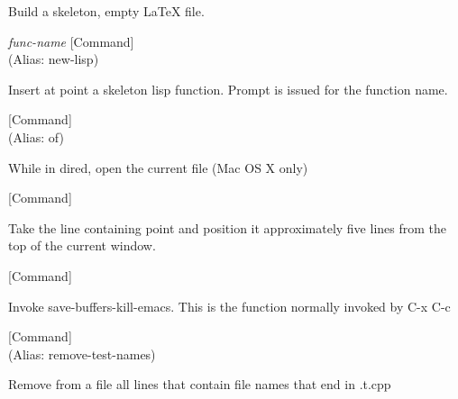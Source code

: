 \begin{doc-string}
Build a skeleton, empty LaTeX file.
\end{doc-string}

\vspace{1em}
\noindent
{}
\usebox{\funcname}\emph{func-name}
 \hfill [Command]\\%
 (Alias: new-lisp)

\begin{doc-string}
Insert at point a skeleton lisp function.  Prompt is issued for the function
name.
\end{doc-string}

\vspace{1em}
\noindent
{}
\usebox{\funcname}
 \hfill [Command]\\%
 (Alias: of)

\begin{doc-string}
While in dired, open the current file (Mac OS X only)
\end{doc-string}

\vspace{1em}
\noindent
{}
\usebox{\funcname}
 \hfill [Command]

\begin{doc-string}
Take the line containing point and position it approximately five lines
from the top of the current window.
\end{doc-string}

\vspace{1em}
\noindent
{}
\usebox{\funcname}
 \hfill [Command]

\begin{doc-string}
Invoke save-buffers-kill-emacs.  This is the function normally
invoked by C-x C-c
\end{doc-string}

\vspace{1em}
\noindent
{}
\usebox{\funcname}
 \hfill [Command]\\%
 (Alias: remove-test-names)

\begin{doc-string}
Remove from a file all lines that contain file names that end in .t.cpp
\end{doc-string}

